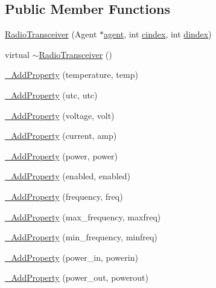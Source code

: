 \subsection*{Public Member Functions}
\begin{DoxyCompactItemize}
\item 
\hyperlink{classcubesat_1_1RadioTransceiver_af785e8d80b098be752539b404186e6cb}{Radio\+Transceiver} (Agent $\ast$\hyperlink{classcubesat_1_1Device_a8499108eccaf7375bea8ead0182391a6}{agent}, int \hyperlink{classcubesat_1_1Device_a1deca725b01f8ef37e49662da6db4e53}{cindex}, int \hyperlink{classcubesat_1_1Device_a8a2b3d6d7400e6796c31705058172982}{dindex})
\item 
virtual \hyperlink{classcubesat_1_1RadioTransceiver_a30988a36b57334c7c24131e1dd1660c0}{$\sim$\+Radio\+Transceiver} ()
\item 
\hyperlink{classcubesat_1_1RadioTransceiver_a580041b634b8ad24443d07e7172977d1}{\+\_\+\+Add\+Property} (temperature, temp)
\item 
\hyperlink{classcubesat_1_1RadioTransceiver_af0269bd98075bf8c19086c107c99c326}{\+\_\+\+Add\+Property} (utc, utc)
\item 
\hyperlink{classcubesat_1_1RadioTransceiver_ae432428cd51ab4dde0bd48da09dcbcb3}{\+\_\+\+Add\+Property} (voltage, volt)
\item 
\hyperlink{classcubesat_1_1RadioTransceiver_ada909dbdb331b383d49952708ed238d7}{\+\_\+\+Add\+Property} (current, amp)
\item 
\hyperlink{classcubesat_1_1RadioTransceiver_a5c3926cb67019211e57ab3a4ef63aa5c}{\+\_\+\+Add\+Property} (power, power)
\item 
\hyperlink{classcubesat_1_1RadioTransceiver_aebed815b814e4e9f88b09d6e2c1a7edb}{\+\_\+\+Add\+Property} (enabled, enabled)
\item 
\hyperlink{classcubesat_1_1RadioTransceiver_a0bd1b6445940d545762f38297cbab769}{\+\_\+\+Add\+Property} (frequency, freq)
\item 
\hyperlink{classcubesat_1_1RadioTransceiver_a304006511eb06938617869b722153a97}{\+\_\+\+Add\+Property} (max\+\_\+frequency, maxfreq)
\item 
\hyperlink{classcubesat_1_1RadioTransceiver_ac7816dfb616ed0730e7f5f0a360bd087}{\+\_\+\+Add\+Property} (min\+\_\+frequency, minfreq)
\item 
\hyperlink{classcubesat_1_1RadioTransceiver_a0862d47cb9a6d2a1144f04a151213ebd}{\+\_\+\+Add\+Property} (power\+\_\+in, powerin)
\item 
\hyperlink{classcubesat_1_1RadioTransceiver_a2f726171eefc33d423083d6efe8f6701}{\+\_\+\+Add\+Property} (power\+\_\+out, powerout)

\end{DoxyCompactItemize}
